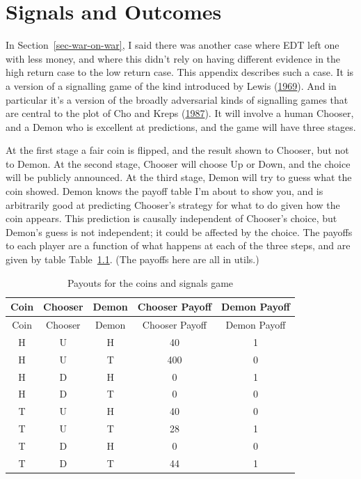 \documentclass[
  12pt,
  letterpaper,
  DIV=11,
  numbers=noendperiod]{scrreprt}
\begin{document}
\hypertarget{sec-war-signal}{%
\chapter{Signals and Outcomes}\label{sec-war-signal}}

In Section~\ref{sec-war-on-war}, I said there was another case where EDT
left one with less money, and where this didn't rely on having different
evidence in the high return case to the low return case. This appendix
describes such a case. It is a version of a signalling game of the kind
introduced by Lewis (\protect\hyperlink{ref-Lewis1969a}{1969}). And in
particular it's a version of the broadly adversarial kinds of signalling
games that are central to the plot of Cho and Kreps
(\protect\hyperlink{ref-ChoKreps1987}{1987}). It will involve a human
Chooser, and a Demon who is excellent at predictions, and the game will
have three stages.

At the first stage a fair coin is flipped, and the result shown to
Chooser, but not to Demon. At the second stage, Chooser will choose Up
or Down, and the choice will be publicly announced. At the third stage,
Demon will try to guess what the coin showed. Demon knows the payoff
table I'm about to show you, and is arbitrarily good at predicting
Chooser's strategy for what to do given how the coin appears. This
prediction is causally independent of Chooser's choice, but Demon's
guess is not independent; it could be affected by the choice. The
payoffs to each player are a function of what happens at each of the
three steps, and are given by table Table~\ref{tbl-payoffs-demon-coin}.
(The payoffs here are all in utils.)

\hypertarget{tbl-payoffs-demon-coin}{}
\begin{longtable}[]{@{}ccccc@{}}
\caption{\label{tbl-payoffs-demon-coin}Payouts for the coins and signals
game}\tabularnewline
\toprule\noalign{}
Coin & Chooser & Demon & Chooser Payoff & Demon Payoff \\
\midrule\noalign{}
\endfirsthead
\toprule\noalign{}
Coin & Chooser & Demon & Chooser Payoff & Demon Payoff \\
\midrule\noalign{}
\endhead
\bottomrule\noalign{}
\endlastfoot
H & U & H & 40 & 1 \\
H & U & T & 400 & 0 \\
H & D & H & 0 & 1 \\
H & D & T & 0 & 0 \\
T & U & H & 40 & 0 \\
T & U & T & 28 & 1 \\
T & D & H & 0 & 0 \\
T & D & T & 44 & 1 \\
\end{longtable}
\end{document}
